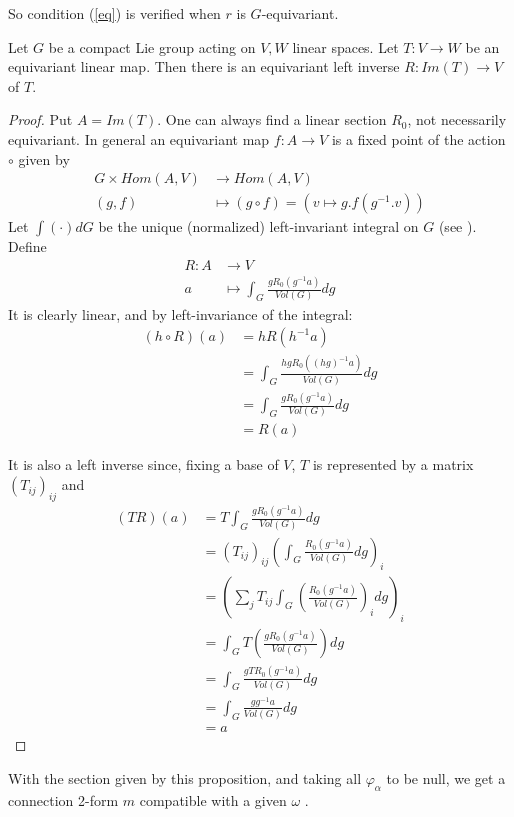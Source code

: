 So condition (\ref{eq}) is verified when $r$ is $G$-equivariant.

\begin{lemma}
Let $G$ be a compact Lie group acting on $V,W$ linear spaces. Let $T:V\rightarrow W$ be an equivariant linear map. Then there is an equivariant left inverse $R:Im(T)\rightarrow V$ of $T$.
\end{lemma}
\begin{proof}
 Put $A=Im(T)$. One can always find a linear section $R_0$, not necessarily equivariant. In general an equivariant map $f:A\rightarrow V$ is a fixed point of the action $\circ$ given by
\begin{align*}
 G\times Hom(A,V)&\rightarrow Hom(A,V)\\
(g,f)&\mapsto (g\circ f)=(v\mapsto g.f(g^{-1}.v))
\end{align*}
Let $\int (\cdotp) dG$ be the unique (normalized) left-invariant integral on $G$ (see \cite[p. 41]{brocker}).
Define
\begin{align*}
 R:A&\rightarrow V\\
a&\mapsto \int_G\frac{g R_0(g^{-1}a)}{Vol(G)}dg
\end{align*}
It is clearly linear, and by left-invariance of the integral:
\begin{align*}
 (h\circ R)(a)&= hR(h^{-1}a)\\
              &= \int_G \frac{hg R_0((hg)^{-1}a)}{Vol(G)}dg\\
              &= \int_G \frac{g R_0(g^{-1}a)}{Vol(G)}dg\\
	      &= R(a)
\end{align*}

It is also a left inverse since, fixing a base of $V$, $T$ is represented by a matrix $(T_{ij})_{ij}$ and
\begin{align*}
 (T R)(a)&=T\int_G \frac{g R_0(g^{-1}a)}{Vol(G)}dg\\
         &=(T_{ij})_{ij}(\int_G \frac{R_0(g^{-1}a)}{Vol(G)} dg)_{i}\\
         &=(\sum_j T_{ij} \int_G (\frac{R_0(g^{-1}a)}{Vol(G)})_i dg)_i\\
         &=\int_G T(\frac{g R_0(g^{-1}a)}{Vol(G)})dg\\
         &=\int_G \frac{gTR_0(g^{-1}a)}{Vol(G)}dg \\
         &=\int_G \frac{gg^{-1}a}{Vol(G)}dg\\
         &= a
\end{align*}
\end{proof}
With the section given by this proposition, and taking all $\varphi_\alpha$ to be null, we get a connection 2-form $m$ compatible with a given $\omega$ .

